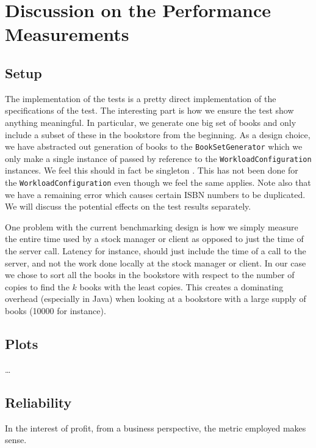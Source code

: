 
\section{Discussion on the Performance Measurements}

\subsection{Setup}
The implementation of the tests is a pretty direct implementation of the
specifications of the test. The interesting part is how we ensure the test
show anything meaningful. In particular, we generate one big set of books and
only include a subset of these in the bookstore from the beginning. As a
design choice, we have abstracted out generation of books to the
{\tt BookSetGenerator} which we only make a single instance of passed by
reference to the {\tt WorkloadConfiguration} instances. We feel this should in
fact be singleton . This has
not been done for the {\tt WorkloadConfiguration} even though we feel the same
applies. Note also that we have a remaining error which causes certain ISBN
numbers to be duplicated. We will discuss the potential effects on the test
results separately.

One problem with the current benchmarking design is how we simply measure the
entire time used by a stock manager or client as opposed to just the time of
the server call. Latency for instance, should just include the time of a call
to the server, and not the work done locally at the stock
manager or client. In our case we chose to sort all the books in the bookstore
with respect to the number of copies to find the $k$ books with the least
copies. This creates a dominating overhead (especially in Java) when looking
at a bookstore with a large supply of books (10000 for instance).

\subsection{Plots}
\dots

\subsection{Reliability}
In the interest of profit, from a business perspective, the metric employed
makes sense.

